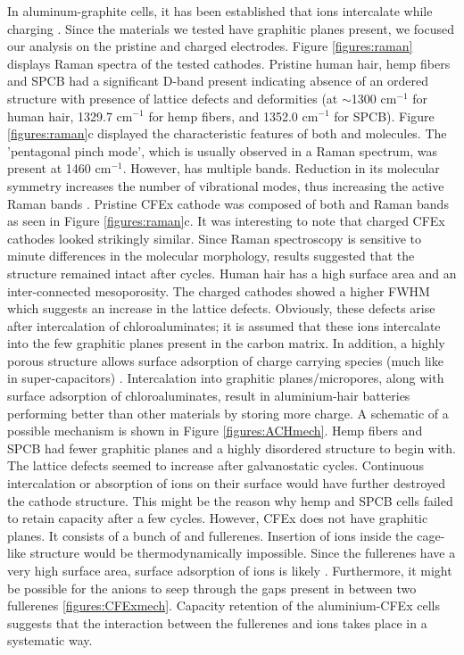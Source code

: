 \documentclass{article}
\begin{document}
In aluminum-graphite cells, it has been established that  ions intercalate while charging \cite{lin_ultrafast_2015}. Since the materials we tested have graphitic planes present, we focused our analysis on the pristine and charged electrodes. Figure \ref{figures:raman} displays Raman spectra of the tested cathodes. Pristine human hair, hemp fibers and SPCB had a significant D-band present indicating absence of an ordered structure with presence of lattice defects and deformities (at $\sim$1300 cm$^{-1}$ for human hair, 1329.7 cm$^{-1}$ for hemp fibers, and 1352.0 cm$^{-1}$ for SPCB). Figure \ref{figures:raman}c displayed the characteristic features of both  and  molecules. The 'pentagonal pinch mode', which is usually observed in a  Raman spectrum, was present at 1460 cm$^{-1}$. However,  has multiple bands. Reduction in its molecular symmetry increases the number of vibrational modes, thus increasing the active Raman bands \cite{kimbrell_analysis_2014}. Pristine CFEx cathode was composed of both  and  Raman bands as seen in Figure \ref{figures:raman}c. It was interesting to note that charged CFEx cathodes looked strikingly similar. Since Raman spectroscopy is sensitive to minute differences in the molecular morphology, results suggested that the structure remained intact after cycles. Human hair has a high surface area and an inter-connected mesoporosity. The charged cathodes showed a higher FWHM which suggests an increase in the lattice defects. Obviously, these defects arise after intercalation of chloroaluminates; it is assumed that these ions intercalate into the few graphitic planes present in the carbon matrix. In addition, a highly porous structure allows surface adsorption of charge carrying species (much like in super-capacitors) \cite{beguin_carbons_2014}. Intercalation into graphitic planes/micropores, along with surface adsorption of chloroaluminates, result in aluminium-hair batteries performing better than other materials by storing more charge\cite{brezesinski_ordered_2010}. A schematic of a possible mechanism is shown in Figure \ref{figures:ACHmech}.
Hemp fibers and SPCB had fewer graphitic planes and a highly disordered structure to begin with. The lattice defects seemed to increase after galvanostatic cycles. Continuous intercalation or absorption of ions on their surface would have further destroyed the cathode structure. This might be the reason why hemp and SPCB cells failed to retain capacity after a few cycles. However, CFEx does not have graphitic planes. It consists of a bunch of  and  fullerenes. Insertion of  ions inside the cage-like structure would be thermodynamically impossible. Since the fullerenes have a very high surface area, surface adsorption of ions is likely \cite{adams}. Furthermore, it might be possible for the anions to seep through the gaps present in between two fullerenes \ref{figures:CFExmech}. Capacity retention of the aluminium-CFEx cells suggests that the interaction between the fullerenes and  ions takes place in a systematic way.
\end{document}

